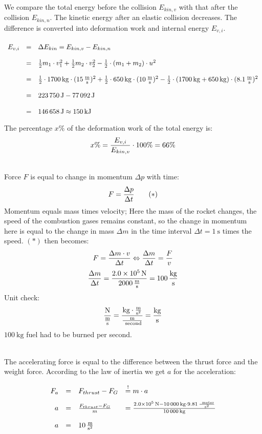 \documentclass[a4paper]{article}
\begin{document}
	\\
	We compare the total energy before the collision $E_{kin,v}$ with that after the collision $E_{kin,n}$. The kinetic energy after an elastic collision decreases. The difference is converted into deformation work and internal energy $E_{v,i}$.
	$$
	\renewcommand{\arraystretch}{2}
	\begin{array}{rcl}
		E_{v,i} & = & \Delta E_{kin} = E_{kin,v} - E_{kin,n} \\
		& = & {1 \over 2}m_1 \cdot v_1^2 + {1 \over 2}m_2 \cdot v_2^2
		- {1 \over 2}\cdot (m_1+m_2) \cdot u^2 \\
		& = & {1 \over 2}\cdot \SI{1700}{\kilogram} \cdot (\SI{15}{\meter\over\second})^2 + {1 \over 2}\cdot\SI {650}{\kilogram} \cdot (\SI{10}{\meter\over\second})^2
		- {1 \over 2}\cdot (\SI{1700}{\kilogram} + \SI{650}{\kilogram}) \cdot (\SI{8,1}{\meter\over\second})^ 2\\
		& = & \SI{223750}{\joule} - \SI{77092}{\joule}\\
		& = & \SI{146658}{\joule} \approx \SI{150}{\kilo\joule}
	\end{array}
	$$
	The percentage $x \%$ of the deformation work of the total energy is:
	$$ x\% = {E_{v,i}\over E_{kin,v}}\cdot 100\%= 66\%$$
	\vspace{0.5 cm}
	
	\\
	Force $F$ is equal to change in momentum $\Delta p $ with time:
	$$F = {\Delta p \over \Delta t} \qquad (*) $$
	Momentum equals mass times velocity; Here the mass of the rocket changes, the speed of the combustion gases remains constant, so the change in momentum here is equal to the change in mass $\Delta m$ in the time interval $ \Delta t = \SI{1}{\second}$ times the speed. $(*)$ then becomes:
	$$F= {\Delta m \cdot v \over \Delta t} \Leftrightarrow {\Delta m \over \Delta t}= {F \over v}$$
	$$ {\Delta m \over \Delta t} = {\SI{2.0e5}{\newton} \over \SI{2000}{\meter\over\second}} = \SI{100}{kg \over s}$$
	Unit check:
	$$ {\SI{}{\newton\over{\meter\over\second}}}= \SI{}{\kilogram\cdot {\meter\over{\second^2}} \over {\meter\over\ second}} = \SI{}{\kilogram\over \second}$$
	$\SI{100}{\kilogram}$ fuel had to be burned per second.
	\vspace{0.5 cm}
	
	\\
	The accelerating force is equal to the difference between the thrust force and the weight force. According to the law of inertia we get $a$ for the acceleration:
	$$
	\renewcommand{\arraystretch}{2}
	\begin{array}{rcll}
		F_a &=& F_{thrust}-F_G &\stackrel{!}{=} m \cdot a\\
		a &=& {F_{thrust}-F_G \over m} & = {\SI{2.0e5}{\newton} - \SI{10000}{\kilogram}\cdot \SI{9.81}{\ meter\over{\second^2}} \over \SI{10000}{\kilogram} }\\
		a &=& \SI{10}{\meter \over {\second^2}}
	\end{array}
	$$
	\vspace{0.5 cm}
	
\end{document}
